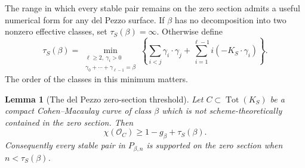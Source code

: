 \documentclass[11pt,reqno]{amsart}
\newtheorem{lemma}[theorem]{Lemma}
\theoremstyle{definition}
\newcommand{\Ocal}{\mathcal O}
\newcommand{\Tot}{\operatorname{Tot}}
\begin{document}
The range in which every stable pair remains on the zero section admits a
useful numerical form for any del Pezzo surface.  If \(\beta\) has no
decomposition into two nonzero effective classes, set
\(\tau_S(\beta)=\infty\).  Otherwise define
\begin{equation}\label{eq:del-pezzo-threshold}
 \tau_S(\beta)=
 \min_{\substack{\ell\ge2,\ \gamma_i>0\\
                  \gamma_0+\cdots+\gamma_{\ell-1}=\beta}}
 \left\{
   \sum_{i<j}\gamma_i\cdot\gamma_j
   +\sum_{i=1}^{\ell-1}i(-K_S\cdot\gamma_i)
 \right\}.
\end{equation}
The order of the classes in this minimum matters.

\begin{lemma}[The del Pezzo zero-section threshold]
\label{lem:del-pezzo-zero-section-threshold}
Let \(C\subset\Tot(K_S)\) be a compact Cohen--Macaulay curve of class
\(\beta\) which is not scheme-theoretically contained in the zero section.
Then
\[
 \chi(\Ocal_C)\ge 1-g_\beta+\tau_S(\beta).
\]
Consequently every stable pair in \(P_{\beta,n}\) is supported on the zero
section when \(n<\tau_S(\beta)\).
\end{lemma}
\end{document}
